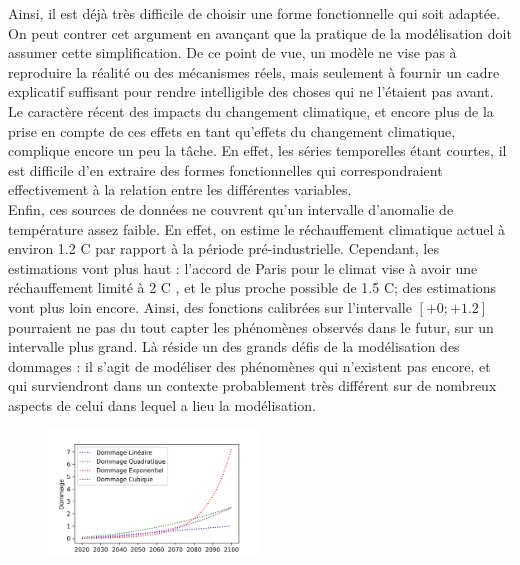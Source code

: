 Ainsi, il est déjà très difficile de choisir une forme fonctionnelle qui soit adaptée. On peut contrer cet argument en avançant que la pratique de la modélisation doit assumer cette simplification. De ce point de vue, un modèle ne vise pas à reproduire la réalité ou des mécanismes réels, mais seulement à fournir un cadre explicatif suffisant pour rendre intelligible des choses qui ne l'étaient pas avant. \\

Le caractère récent des impacts du changement climatique, et encore plus de la prise en compte de ces effets en tant qu'effets du changement climatique, complique encore un peu la tâche. En effet, les séries temporelles étant courtes, il est difficile d'en extraire des formes fonctionnelles qui correspondraient effectivement à la relation entre les différentes variables. \\

Enfin, ces sources de données ne couvrent qu'un intervalle d'anomalie de température assez faible. En effet, on estime le réchauffement climatique actuel à environ 1.2 \textdegree C par rapport à la période pré-industrielle. Cependant, les estimations vont plus haut : l'accord de Paris pour le climat vise à avoir une réchauffement limité à 2 \textdegree C , et le plus proche possible de 1.5 \textdegree C; des estimations vont plus loin encore. Ainsi, des fonctions calibrées sur l'intervalle $[+0; +1.2]$ pourraient ne pas du tout capter les phénomènes observés dans le futur, sur un intervalle plus grand. Là réside un des grands défis de la modélisation des dommages : il s'agit de modéliser des phénomènes qui n'existent pas encore, et qui surviendront dans un contexte probablement très différent sur de nombreux aspects de celui dans lequel a lieu la modélisation. 

\begin{landscape}
\end{landscape}

\begin{figure}[ht]
\centering
\includegraphics[width=0.5\textwidth]{results/shape.png}
\end{figure}


